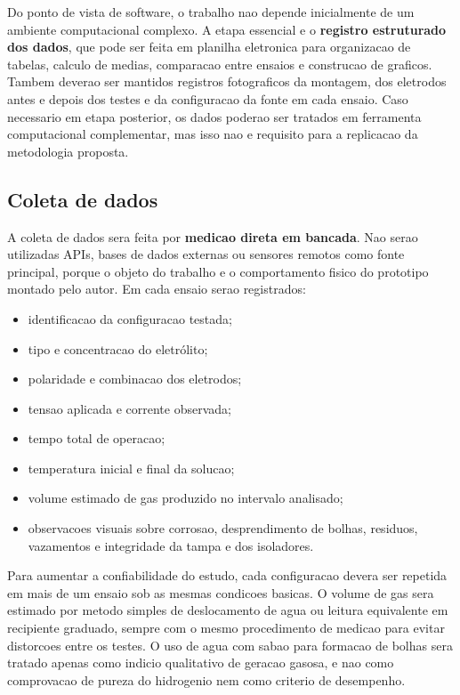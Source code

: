 \documentclass[12pt,oneside,a4paper,brazilian]{abntex2}
\begin{document}
Do ponto de vista de software, o trabalho nao depende inicialmente de um ambiente computacional complexo. A etapa essencial e o \textbf{registro estruturado dos dados}, que pode ser feita em planilha eletronica para organizacao de tabelas, calculo de medias, comparacao entre ensaios e construcao de graficos. Tambem deverao ser mantidos registros fotograficos da montagem, dos eletrodos antes e depois dos testes e da configuracao da fonte em cada ensaio. Caso necessario em etapa posterior, os dados poderao ser tratados em ferramenta computacional complementar, mas isso nao e requisito para a replicacao da metodologia proposta.

\subsection{Coleta de dados}

A coleta de dados sera feita por \textbf{medicao direta em bancada}. Nao serao utilizadas APIs, bases de dados externas ou sensores remotos como fonte principal, porque o objeto do trabalho e o comportamento fisico do prototipo montado pelo autor. Em cada ensaio serao registrados:

\begin{itemize}
  \item identificacao da configuracao testada;
  \item tipo e concentracao do eletrólito;
  \item polaridade e combinacao dos eletrodos;
  \item tensao aplicada e corrente observada;
  \item tempo total de operacao;
  \item temperatura inicial e final da solucao;
  \item volume estimado de gas produzido no intervalo analisado;
  \item observacoes visuais sobre corrosao, desprendimento de bolhas, residuos, vazamentos e integridade da tampa e dos isoladores.
\end{itemize}

Para aumentar a confiabilidade do estudo, cada configuracao devera ser repetida em mais de um ensaio sob as mesmas condicoes basicas. O volume de gas sera estimado por metodo simples de deslocamento de agua ou leitura equivalente em recipiente graduado, sempre com o mesmo procedimento de medicao para evitar distorcoes entre os testes. O uso de agua com sabao para formacao de bolhas sera tratado apenas como indicio qualitativo de geracao gasosa, e nao como comprovacao de pureza do hidrogenio nem como criterio de desempenho.
\end{document}
